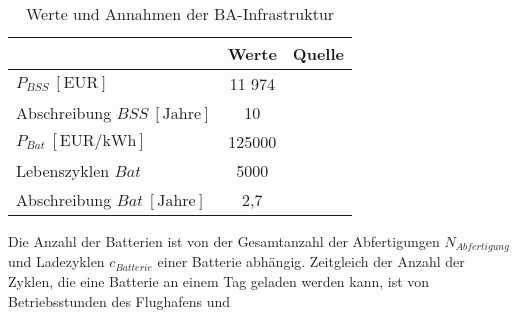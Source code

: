 %
%
%
%
%
\begin{table}[h]
	\begin{center}
    \caption{Werte und Annahmen der BA-Infrastruktur}
	\label{BA_Infrastrukturtab}
	\begin{tabular}{|l|c|c|}
		\hline
		 & \textbf{Werte} & \textbf{Quelle} \\ \hline
		$P_{BSS} ~[\text{EUR}]$ &  11 974  & \cite{guo2020aviation} \\ \hline
      Abschreibung $BSS ~[\text{Jahre}]$&  10  & \cite{salucci2020optimal} \\ \hline
		$P_{Bat} ~[\text{EUR/kWh}]$ & 125000 & \cite{guo2020aviation} \\ \hline
      Lebenszyklen $Bat$ & 5000 & \cite{reimers2018introduction} \\ \hline
      Abschreibung $Bat ~[\text{Jahre}]$& 2,7 & \\ \hline
	\end{tabular}
    \end{center}
\end{table}
Die Anzahl der Batterien ist von der Gesamtanzahl der Abfertigungen $N_{Abfertigung}$ und Ladezyklen $c_{Batterie}$ einer Batterie abhängig. 
Zeitgleich der Anzahl der Zyklen, die eine Batterie an einem Tag geladen werden kann, ist von Betriebsstunden des Flughafens und 
